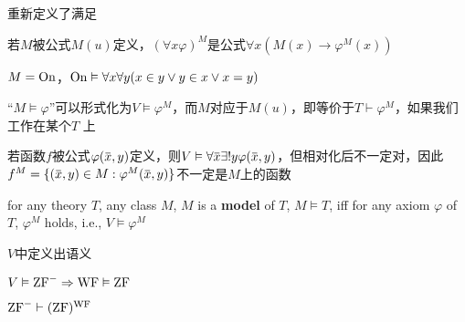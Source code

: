 \documentclass[11pt]{article}
\begin{document}
重新定义了满足

若\(M\)被公式\(M(u)\)定义，\((\forall x\varphi)^{M}\)是公式\(\forall x(M(x)\to\varphi^{M}(x))\)

\begin{examplle}[]
\(M=\operatorname{On}\)，\(\operatorname{On}\vDash\forall x\forall y(x\in y\vee y\in x\vee x= y)\)
\end{examplle}

``\(M\vDash\varphi\)''可以形式化为\(V\vDash\varphi^M\)，而\(M\)对应于\(M(u)\)，即等价于\(T\vdash\varphi^M\)，如果我们工作在某个\(T\)
上

若函数\(f\)被公式\(\varphi(\barx,y)\)定义，则\(V\vDash\forall\barx\exists!y\varphi(\barx,y)\)，但相对化后不一定对，因此
\(f^M=\{(\barx,y)\in M:\varphi^M(\barx,y)\}\)不一定是\(M\)上的函数

\begin{definition}[]
for any theory \(T\), any class \(M\), \(M\) is a \textbf{model} of \(T\), \(M\vDash T\), iff for any axiom
\(\varphi\) of \(T\), \(\varphi^M\) holds, i.e., \(V\vDash\varphi^M\)
\end{definition}

\(V\)中定义出语义

\begin{theorem}[]
\(V\vDash\text{ZF}^-\Rightarrow\operatorname{WF}\vDash\operatorname{ZF}\)

\(\text{ZF}^-\vdash(\operatorname{ZF})^{\operatorname{WF}}\)
\end{theorem}
\end{document}
